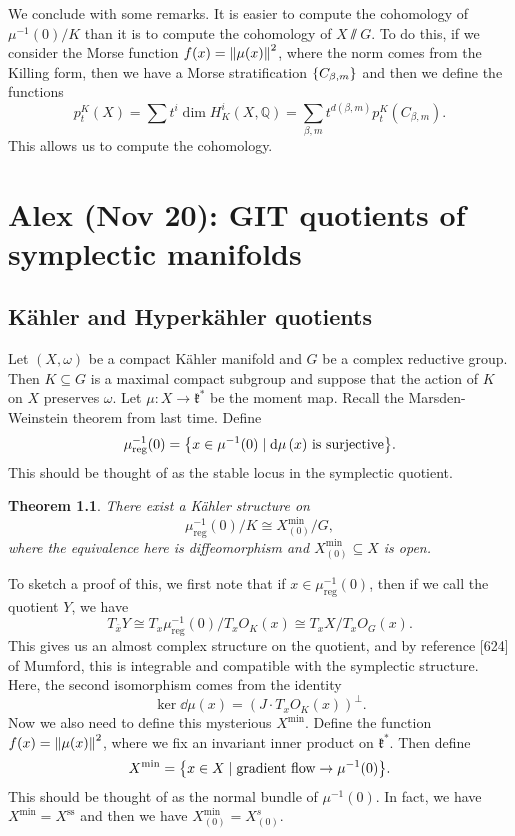 \documentclass[leqno, openany]{memoir}
\newtheorem{thm}{Theorem}[section]
\theoremstyle{definition}
\theoremstyle{remark}
\theoremstyle{plain}
\theoremstyle{definition}
\theoremstyle{remark}
\newcommand{\Q}{\mathbb{Q}}
\newcommand{\mf}[1]{\mathfrak{#1}}
\newcommand{\mr}[1]{\mathrm{#1}}
\newcommand{\ol}[1]{\overline{#1}}
\begin{document}
We conclude with some remarks. It is easier to compute the cohomology of $\mu^{-1}(0) / K$ than it is to compute the cohomology of $X \sslash G$. To do this, if we consider the Morse function $f(x) = \norm{\mu(x)}^2$, where the norm comes from the Killing form, then we have a Morse stratification $\qty{C_{\beta, m}}$ and then we define the functions 
\[ p_t^K(X) = \sum t^i \dim H_K^i(X,\Q) = \sum_{\beta, m} t^{d(\beta, m)} p_t^K(C_{\beta, m}). \]
This allows us to compute the cohomology.

\chapter{Alex (Nov 20): GIT quotients of symplectic manifolds}%
\label{cha:alex_nov_20_git_quotients_of_symplectic_manifolds}

\section{K\"ahler and Hyperk\"ahler quotients}%
\label{sec:k"ahler_and_hyperk"ahler_quotients}

Let $(X, \omega)$ be a compact K\"ahler manifold and $G$ be a complex reductive group. Then $K \subseteq G$ is a maximal compact subgroup and suppose that the action of $K$ on $X$ preserves $\omega$. Let $\mu \colon X \to \mf{k}^*$ be the moment map. Recall the Marsden-Weinstein theorem from last time. Define 
\[ \mu_{\mr{reg}}^{-1}(0) = \qty{x \in \mu^{-1}(0) \mid \dd{\mu}(x) \text{ is surjective}}. \]
This should be thought of as the stable locus in the symplectic quotient.

\begin{thm}
    There exist a K\"ahler structure on
    \[ \mu_{\mr{reg}}^{-1}(0) / K \cong X_{(0)}^{\mr{min}} / G, \]
    where the equivalence here is diffeomorphism and $X_{(0)}^{\mr{min}} \subseteq X$ is open.
\end{thm}

To sketch a proof of this, we first note that if $x \in \mu_{\mr{reg}}^{-1}(0)$, then if we call the quotient $Y$, we have 
\[ T_{\ol{x}} Y \cong T_x \mu^{-1}_{\mr{reg}}(0) / T_x O_K(x) \cong T_x X / T_x O_G(x). \]
This gives us an almost complex structure on the quotient, and by reference [624] of Mumford, this is integrable and compatible with the symplectic structure. Here, the second isomorphism comes from the identity
\[ \ker \dd{\mu(x)} = (J \cdot T_x O_K(x))^{\perp}. \]
Now we also need to define this mysterious $X^{\mr{min}}$. Define the function $f(x) = \norm{\mu(x)}^2$, where we fix an invariant inner product on $\mf{k}^*$. Then define
\[ X^{\mr{min}} = \qty{ x \in X \mid \text{gradient flow} \to \mu^{-1}(0) }. \]
This should be thought of as the normal bundle of $\mu^{-1}(0)$. In fact, we have $X^{\mr{min}} = X^{\mr{ss}}$ and then we have $X_{(0)}^{\mr{min}} = X_{(0)}^{s}$.
\end{document}
